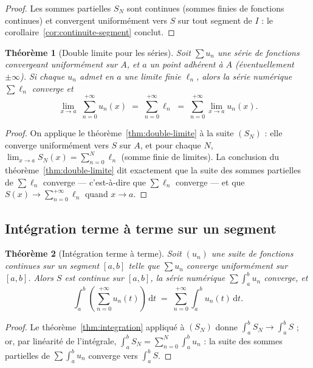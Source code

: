 \documentclass[11pt,a4paper]{article}
\theoremstyle{plain}
\newtheorem{theoreme}{Théorème}[section]
\theoremstyle{definition}
\theoremstyle{remark}
\newcommand{\dd}{\,\mathrm{d}}
\numberwithin{equation}{section}
\begin{document}
\begin{proof}
Les sommes partielles $S_N$ sont continues (sommes finies de fonctions
continues) et convergent uniformément vers $S$ sur tout segment de $I$ :
le corollaire~\ref{cor:continuite-segment} conclut.
\end{proof}

\begin{theoreme}[Double limite pour les séries]\label{thm:double-limite-series}
Soit $\sum u_n$ une série de fonctions convergeant uniformément sur $A$,
et $a$ un point adhérent à $A$ (éventuellement $\pm\infty$). Si chaque
$u_n$ admet en $a$ une limite finie $\ell_n$, alors la série numérique
$\sum \ell_n$ converge et
\[
    \lim_{x\to a}\; \sum_{n=0}^{+\infty} u_n(x)
    \;=\; \sum_{n=0}^{+\infty} \ell_n
    \;=\; \sum_{n=0}^{+\infty} \lim_{x\to a} u_n(x) .
\]
\end{theoreme}

\begin{proof}
On applique le théorème~\ref{thm:double-limite} à la suite $(S_N)$ : elle
converge uniformément vers $S$ sur $A$, et pour chaque $N$,
$\lim_{x\to a} S_N(x) = \sum_{n=0}^{N}\ell_n$ (somme finie de limites). La
conclusion du théorème~\ref{thm:double-limite} dit exactement que la suite
des sommes partielles de $\sum\ell_n$ converge --- c'est-à-dire que
$\sum\ell_n$ converge --- et que $S(x)\to\sum_{n=0}^{+\infty}\ell_n$
quand $x\to a$.
\end{proof}

\subsection{Intégration terme à terme sur un segment}

\begin{theoreme}[Intégration terme à terme]\label{thm:integration-series}
Soit $(u_n)$ une suite de fonctions continues sur un segment $[a,b]$ telle
que $\sum u_n$ converge uniformément sur $[a,b]$. Alors $S$ est continue
sur $[a,b]$, la série numérique $\sum \int_a^b u_n$ converge, et
\[
    \int_a^b \left(\sum_{n=0}^{+\infty} u_n(t)\right)\dd t
    \;=\; \sum_{n=0}^{+\infty} \int_a^b u_n(t)\dd t .
\]
\end{theoreme}

\begin{proof}
Le théorème~\ref{thm:integration} appliqué à $(S_N)$ donne
$\int_a^b S_N \to \int_a^b S$ ; or, par linéarité de l'intégrale,
$\int_a^b S_N = \sum_{n=0}^{N}\int_a^b u_n$ : la suite des sommes
partielles de $\sum\int_a^b u_n$ converge vers $\int_a^b S$.
\end{proof}
\end{document}
